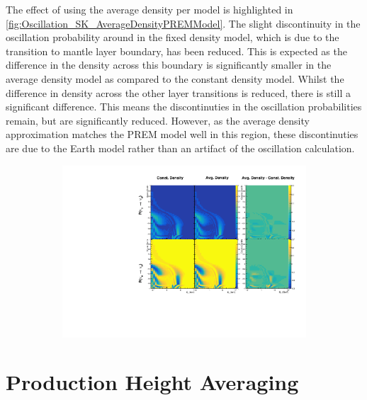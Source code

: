 The effect of using the average density per  model is highlighted in \autoref{fig:Oscillation_SK_AverageDensityPREMModel}. The slight discontinuity in the oscillation probability around  in the fixed density model, which is due to the transition to mantle layer boundary, has been reduced. This is expected as the difference in the density across this boundary is significantly smaller in the average density model as compared to the constant density model. Whilst the difference in density across the other layer transitions is reduced, there is still a significant difference. This means the discontinuties in the oscillation probabilities remain, but are significantly reduced. However, as the average density approximation matches the PREM model well in this region, these discontinuties are due to the Earth model rather than an artifact of the oscillation calculation.

\begin{figure}[h]
  \begin{subfigure}[t]{\textwidth}
    \includegraphics[width=\textwidth, trim={0mm 0mm 0mm 0mm}, clip,page=1]{Figures/Oscillation/AverageDensityPREMModel.pdf}
  \end{subfigure}
  \caption{}
  \label{fig:Oscillation_SK_AverageDensityPREMModel}
\end{figure}

\clearpage

\section{Production Height Averaging}
\label{sec:Oscillation_ProdHAvergaing}

